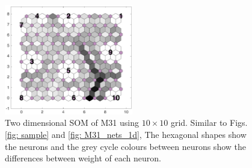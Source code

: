 \begin{figure}
        \centering
        \includegraphics[width=0.5\textwidth]{../../images0.01/M31/2D/diff_dimension/combine_2D_data_between_cols3and26.png}
    \caption{Two dimensional SOM of M31 using $10\times10$ grid. Similar to Figs.\ref{fig: sample} and \ref{fig: M31_nets_1d}, The hexagonal shapes show the neurons and the grey cycle colours between neurons show the differences between weight of each neuron.}
    \label{fig: all_derived_ones}
\end{figure}